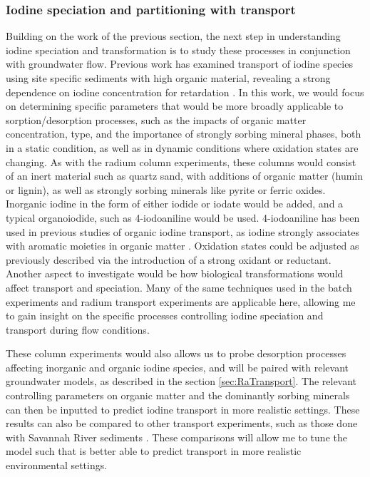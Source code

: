 \documentclass[twoside,12pt,titlepage]{article}
\begin{document}
\subsubsection{Iodine speciation and partitioning with transport}
Building on the work of the previous section, the next step in understanding iodine speciation and transformation is to study these processes in conjunction with groundwater flow. Previous work has examined transport of iodine species using site specific sediments with high organic material, revealing a strong dependence on iodine concentration for retardation \cite{Zhang2011}. In this work, we would focus on determining specific parameters that would be more broadly applicable to sorption/desorption processes, such as the impacts of organic matter concentration, type, and the importance of strongly sorbing mineral phases, both in a static condition, as well as in dynamic conditions where oxidation states are changing. As with the radium column experiments, these columns would consist of an inert material such as quartz sand, with additions of organic matter (humin or lignin), as well as strongly sorbing minerals like pyrite or ferric oxides. Inorganic iodine in the form of either iodide or iodate would be added, and a typical organoiodide, such as 4-iodoaniline would be used. 4-iodoaniline has been used in previous studies of organic iodine transport, as iodine strongly associates with aromatic moieties in organic matter \cite{Kaplan2014}. Oxidation states could be adjusted as previously described via the introduction of a strong oxidant or reductant. Another aspect to investigate would be how biological transformations would affect transport and speciation. Many of the same techniques used in the batch experiments and radium transport experiments are applicable here, allowing me to gain insight on the specific processes controlling iodine speciation and transport during flow conditions.
\par These column experiments would also allows us to probe desorption processes affecting inorganic and organic iodine species, and will be paired with relevant groundwater models, as described in the section \ref{sec:RaTransport}. The relevant controlling parameters on organic matter and the dominantly sorbing minerals can then be inputted to predict iodine transport in more realistic settings. These results can also be compared to other transport experiments, such as those done with Savannah River sediments \cite{Zhang2011}. These comparisons will allow me to tune the model such that is better able to predict transport in more realistic environmental settings.
\end{document}
